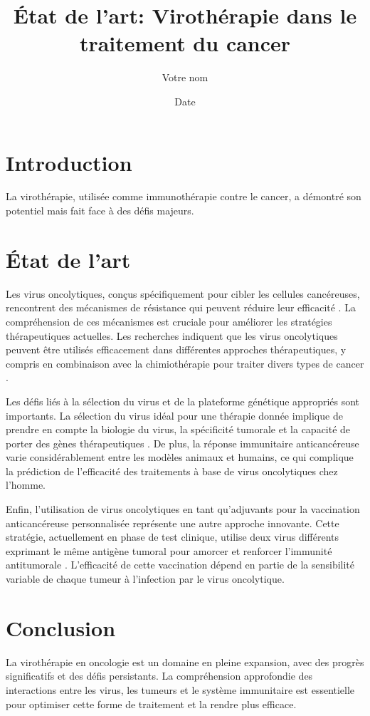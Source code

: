 \documentclass{article}
\title{État de l'art: Virothérapie dans le traitement du cancer}
\author{Votre nom}
\date{Date}
\begin{document}
\maketitle

\section*{Introduction}

La virothérapie, utilisée comme immunothérapie contre le cancer, a démontré son potentiel mais fait face à des défis majeurs.

\section*{État de l'art}

Les virus oncolytiques, conçus spécifiquement pour cibler les cellules cancéreuses, rencontrent des mécanismes de résistance qui peuvent réduire leur efficacité \cite{goradel2022}. La compréhension de ces mécanismes est cruciale pour améliorer les stratégies thérapeutiques actuelles. Les recherches indiquent que les virus oncolytiques peuvent être utilisés efficacement dans différentes approches thérapeutiques, y compris en combinaison avec la chimiothérapie pour traiter divers types de cancer \cite{zeyaullah2012}.

Les défis liés à la sélection du virus et de la plateforme génétique appropriés sont importants. La sélection du virus idéal pour une thérapie donnée implique de prendre en compte la biologie du virus, la spécificité tumorale et la capacité de porter des gènes thérapeutiques \cite{mcfadden2021}. De plus, la réponse immunitaire anticancéreuse varie considérablement entre les modèles animaux et humains, ce qui complique la prédiction de l'efficacité des traitements à base de virus oncolytiques chez l'homme.

Enfin, l'utilisation de virus oncolytiques en tant qu'adjuvants pour la vaccination anticancéreuse personnalisée représente une autre approche innovante. Cette stratégie, actuellement en phase de test clinique, utilise deux virus différents exprimant le même antigène tumoral pour amorcer et renforcer l'immunité antitumorale \cite{pubmed2021}. L'efficacité de cette vaccination dépend en partie de la sensibilité variable de chaque tumeur à l'infection par le virus oncolytique.

\section*{Conclusion}

La virothérapie en oncologie est un domaine en pleine expansion, avec des progrès significatifs et des défis persistants. La compréhension approfondie des interactions entre les virus, les tumeurs et le système immunitaire est essentielle pour optimiser cette forme de traitement et la rendre plus efficace.



\end{document}
